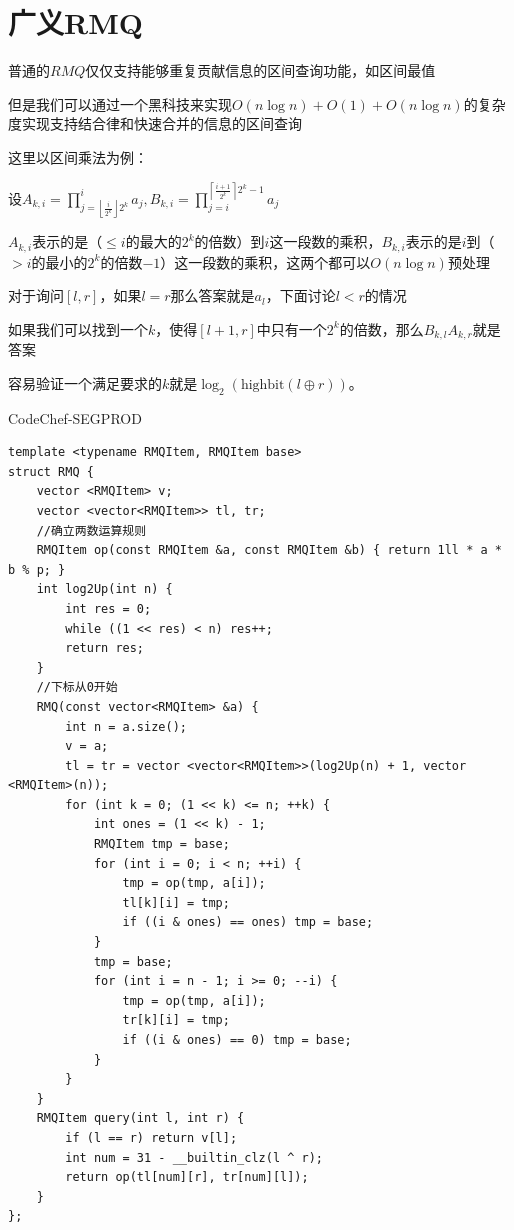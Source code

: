 \section{广义RMQ}

普通的$RMQ$仅仅支持能够重复贡献信息的区间查询功能，如区间最值\par
但是我们可以通过一个黑科技来实现$O(n \log n) + O(1) + O(n \log n)$的复杂度实现支持结合律和快速合并的信息的区间查询\par

这里以区间乘法为例：\par
设$A_{k,i}=\prod\limits_{j=\left\lfloor\frac i{2^k}\right\rfloor2^k}^ia_j,B_{k,i}=\prod\limits_{j=i}^{\left\lceil\frac{i+1}{2^k}\right\rceil2^k-1}a_j$\par

$A_{k,i}$表示的是（$\leq i$的最大的$2^k$的倍数）到$i$这一段数的乘积，$B_{k,i}$表示的是$i$到（$> i$的最小的$2^k$的倍数$-1$）这一段数的乘积，这两个都可以$O(n\log n)$预处理\par

对于询问$[l,r]$，如果$l=r$那么答案就是$a_l$，下面讨论$l < r$的情况\par

如果我们可以找到一个$k$，使得$[l+1,r]$中只有一个$2^k$的倍数，那么$B_{k,l}A_{k,r}$就是答案\par

容易验证一个满足要求的$k$就是$\log_2\left(\text{highbit}(l \oplus r)\right)$。\par

CodeChef-SEGPROD
\begin{lstlisting}
template <typename RMQItem, RMQItem base> 
struct RMQ {
	vector <RMQItem> v;
	vector <vector<RMQItem>> tl, tr;
	//确立两数运算规则
	RMQItem op(const RMQItem &a, const RMQItem &b) { return 1ll * a * b % p; }
	int log2Up(int n) { 
	    int res = 0;
	    while ((1 << res) < n) res++;
	    return res; 
	}
	//下标从0开始
	RMQ(const vector<RMQItem> &a) {
		int n = a.size();
		v = a;
		tl = tr = vector <vector<RMQItem>>(log2Up(n) + 1, vector <RMQItem>(n));
		for (int k = 0; (1 << k) <= n; ++k) {
			int ones = (1 << k) - 1;
			RMQItem tmp = base;
			for (int i = 0; i < n; ++i) {
				tmp = op(tmp, a[i]);
				tl[k][i] = tmp;
				if ((i & ones) == ones) tmp = base;
			}
			tmp = base;
			for (int i = n - 1; i >= 0; --i) {
				tmp = op(tmp, a[i]);
				tr[k][i] = tmp;
				if ((i & ones) == 0) tmp = base;
			}
		}
	}
	RMQItem query(int l, int r) {
		if (l == r) return v[l];
		int num = 31 - __builtin_clz(l ^ r);
		return op(tl[num][r], tr[num][l]);
	}
};
\end{lstlisting}

